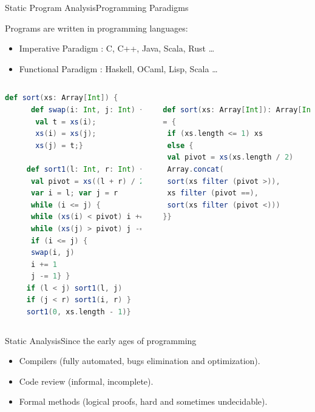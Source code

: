 \begin{frame}[fragile]{Static Program Analysis}{Programming Paradigms}

Programs are written in programming languages:
\begin{itemize}
	\item Imperative Paradigm : C, C++, Java, Scala, Rust \dots
	\item Functional Paradigm : Haskell, OCaml, Lisp, Scala \dots
\end{itemize}

\tiny
\begin{columns}
		\centering
	\begin{lstlisting}[language=Scala,caption={Scala Imperative}]
     def sort(xs: Array[Int]) {
      def swap(i: Int, j: Int) {
       val t = xs(i);
       xs(i) = xs(j);
       xs(j) = t;} 
      
     def sort1(l: Int, r: Int) {
      val pivot = xs((l + r) / 2)
      var i = l; var j = r
      while (i <= j) {
      while (xs(i) < pivot) i += 1
      while (xs(j) > pivot) j -= 1
      if (i <= j) {
      swap(i, j)
      i += 1
      j -= 1} }
     if (l < j) sort1(l, j)
     if (j < r) sort1(i, r) }
     sort1(0, xs.length - 1)} 
    \end{lstlisting}
    
    \centering
   \tiny 

	\begin{lstlisting}[language=Scala,caption={Scala Functionnal}]

  def sort(xs: Array[Int]): Array[Int] 
  = {
   if (xs.length <= 1) xs
   else {
   val pivot = xs(xs.length / 2)
   Array.concat(
   sort(xs filter (pivot >)),
   xs filter (pivot ==),
   sort(xs filter (pivot <)))
  }}
    \end{lstlisting}
\end{columns}

\end{frame}

\begin{frame}{Static Analysis}{Since the early ages of programming}
\begin{itemize}
\item Compilers (fully automated, bugs elimination and optimization).
\item Code review (informal, incomplete).
\item Formal methods (logical proofs, hard and sometimes undecidable).
\end{itemize}

\end{frame}


